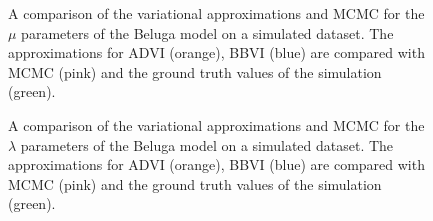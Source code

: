 \begin{figure}
    \noindent{}
	\caption[Beluga simulation: VI approximation and MCMC comparison]{A comparison of the variational approximations and MCMC for the $\mu$ parameters of the Beluga model on a simulated dataset. The approximations for ADVI (orange), BBVI (blue) are compared with MCMC (pink) and the ground truth values of the simulation (green).}
    \label{fig:beluga-sim-distribution-mu}
\end{figure}

\begin{figure}
    \noindent{}
	\caption[Beluga simulation: VI approximation and MCMC comparison]{A comparison of the variational approximations and MCMC for the $\lambda$ parameters of the Beluga model on a simulated dataset. The approximations for ADVI (orange), BBVI (blue) are compared with MCMC (pink) and the ground truth values of the simulation (green).}
    \label{fig:beluga-sim-svgd}
\end{figure}

